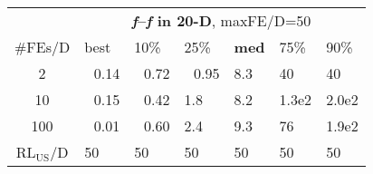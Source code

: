 \begin{tabular}{c|llllll}
 & \multicolumn{6}{|c}{\textbf{\textit{f}\raisebox{-0.35ex}{1}--\textit{f}\raisebox{-0.35ex}{24} in 20-D}, maxFE/D=50}\\
\#FEs/D & best & 10\% & 25\% & \textbf{med} & 75\% & 90\%\\
2 & ~\,0.14 & ~\,0.72 & ~\,0.95 & \hspace*{1ex}8.3 & 40 & 40\\
10 & ~\,0.15 & ~\,0.42 & \hspace*{1ex}1.8 & \hspace*{1ex}8.2 & 1.3e2 & 2.0e2\\
100 & ~\,0.01 & ~\,0.60 & \hspace*{1ex}2.4 & \hspace*{1ex}9.3 & 76 & 1.9e2\\
$\text{RL}_{\text{US}}$/D & 50 & 50 & 50 & 50 & 50 & 50
\end{tabular}
